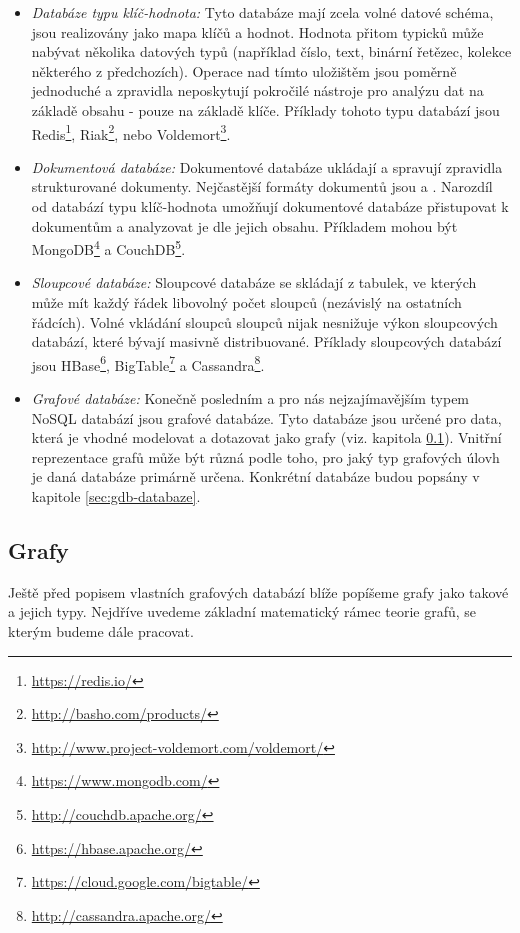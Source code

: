 \begin{itemize}
  \item{\textit{Databáze typu klíč-hodnota:}} Tyto databáze mají zcela volné datové schéma, jsou realizovány jako mapa klíčů a hodnot. Hodnota přitom typicků může nabývat několika datových typů (například číslo, text, binární řetězec, kolekce některého z předchozích). Operace nad tímto uložištěm jsou poměrně jednoduché a zpravidla neposkytují pokročilé nástroje pro analýzu dat na základě obsahu - pouze na základě klíče. Příklady tohoto typu databází jsou Redis\footnote{\url{https://redis.io/}}, Riak\footnote{\url{http://basho.com/products/}}, nebo Voldemort\footnote{\url{http://www.project-voldemort.com/voldemort/}}.
  \item{\textit{Dokumentová databáze:}} Dokumentové databáze ukládají a spravují zpravidla strukturované dokumenty. Nejčastější formáty dokumentů jsou \textit{} a \textit{}. Narozdíl od databází typu klíč-hodnota umožňují dokumentové databáze přistupovat k dokumentům a analyzovat je dle jejich obsahu. Příkladem mohou být MongoDB\footnote{\url{https://www.mongodb.com/}} a CouchDB\footnote{\url{http://couchdb.apache.org/}}.  
  \item{\textit{Sloupcové databáze:}} Sloupcové databáze se skládají z tabulek, ve kterých může mít každý řádek libovolný počet sloupců (nezávislý na ostatních řádcích). Volné vkládání sloupců sloupců nijak nesnižuje výkon sloupcových databází, které bývají masivně distribuované. Příklady sloupcových databází jsou HBase\footnote{\url{https://hbase.apache.org/}}, BigTable\footnote{\url{https://cloud.google.com/bigtable/}} a Cassandra\footnote{\url{http://cassandra.apache.org/}}.
  \item{\textit{Grafové databáze:}} Konečně posledním a pro nás nejzajímavějším typem NoSQL databází jsou grafové databáze. Tyto databáze jsou určené pro data, která je vhodné modelovat a dotazovat jako grafy (viz. kapitola \ref{sec:gdb-grafy}). Vnitřní reprezentace grafů může být různá podle toho, pro jaký typ grafových úlovh je daná databáze primárně určena. Konkrétní databáze budou popsány v kapitole \ref{sec:gdb-databaze}.
\end{itemize}


\subsection{Grafy}
\label{sec:gdb-grafy}
Ještě před popisem vlastních grafových databází blíže popíšeme grafy jako takové a jejich typy. Nejdříve uvedeme základní matematický rámec teorie grafů, se kterým budeme dále pracovat. 

